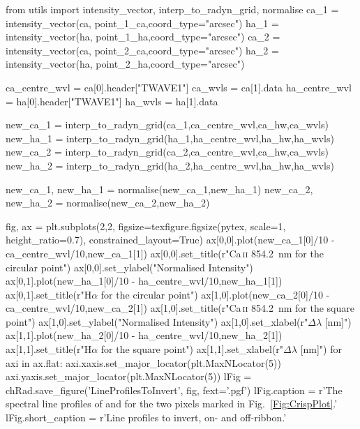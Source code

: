 \begin{pycode}[Radynversion]
from utils import intensity_vector, interp_to_radyn_grid, normalise
ca_1 = intensity_vector(ca, point_1_ca,coord_type="arcsec")
ha_1 = intensity_vector(ha, point_1_ha,coord_type="arcsec")
ca_2 = intensity_vector(ca, point_2_ca,coord_type="arcsec")
ha_2 = intensity_vector(ha, point_2_ha,coord_type="arcsec")

ca_centre_wvl = ca[0].header["TWAVE1"]
ca_wvls = ca[1].data
ha_centre_wvl = ha[0].header["TWAVE1"]
ha_wvls = ha[1].data

new_ca_1 = interp_to_radyn_grid(ca_1,ca_centre_wvl,ca_hw,ca_wvls)
new_ha_1 = interp_to_radyn_grid(ha_1,ha_centre_wvl,ha_hw,ha_wvls)
new_ca_2 = interp_to_radyn_grid(ca_2,ca_centre_wvl,ca_hw,ca_wvls)
new_ha_2 = interp_to_radyn_grid(ha_2,ha_centre_wvl,ha_hw,ha_wvls)

new_ca_1, new_ha_1 = normalise(new_ca_1,new_ha_1)
new_ca_2, new_ha_2 = normalise(new_ca_2,new_ha_2)

fig, ax = plt.subplots(2,2,
figsize=texfigure.figsize(pytex, scale=1, height_ratio=0.7),
constrained_layout=True)
ax[0,0].plot(new_ca_1[0]/10 - ca_centre_wvl/10,new_ca_1[1])
ax[0,0].set_title(r"Ca\,\textsc{ii} \SI{854.2}{\nano\metre} for the circular point")
ax[0,0].set_ylabel("Normalised Intensity")
ax[0,1].plot(new_ha_1[0]/10 - ha_centre_wvl/10,new_ha_1[1])
ax[0,1].set_title(r"H$\alpha$ for the circular point")
ax[1,0].plot(new_ca_2[0]/10 - ca_centre_wvl/10,new_ca_2[1])
ax[1,0].set_title(r"Ca\,\textsc{ii} \SI{854.2}{\nano\metre} for the square point")
ax[1,0].set_ylabel("Normalised Intensity")
ax[1,0].set_xlabel(r"$\Delta\lambda$ [nm]")
ax[1,1].plot(new_ha_2[0]/10 - ha_centre_wvl/10,new_ha_2[1])
ax[1,1].set_title(r"H$\alpha$ for the square point")
ax[1,1].set_xlabel(r"$\Delta\lambda$ [nm]")
for axi in ax.flat:
    axi.xaxis.set_major_locator(plt.MaxNLocator(5))
    axi.yaxis.set_major_locator(plt.MaxNLocator(5))
lFig = chRad.save_figure('LineProfilesToInvert', fig, fext='.pgf')
lFig.caption = r'The spectral line profiles of \CaLine{} and \Ha{} for the two pixels marked in Fig.~\ref{Fig:CrispPlot}.'
lFig.short_caption = r'Line profiles to invert, on- and off-ribbon.'
\end{pycode}

